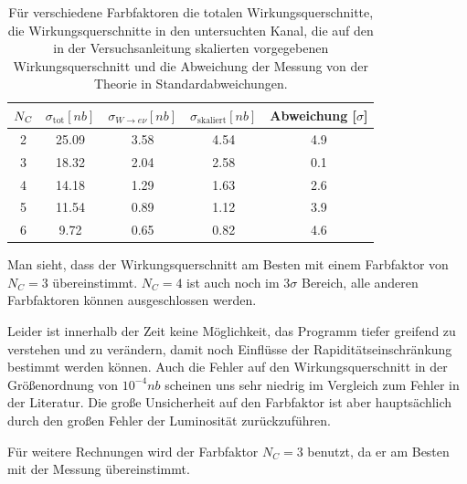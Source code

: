 \documentclass[a4paper,12pt]{article}
\begin{document}
\begin{table}[h]
	\centering
	\begin{tabular}{c| c c c|c}
		$N_{\textsl{C}}$ & $\sigma_\text{tot} [\si{nb}]$ &$σ_{W\rightarrow eν}[\si{nb}]$ &
		$σ_\text{skaliert}[\si{nb}]$
		& Abweichung [$σ$] \\
		\hline
2 & 25.09 & 3.58 & 4.54 & 4.9 \\
\hline
3 & 18.32 & 2.04 & 2.58 & 0.1 \\
4 & 14.18 & 1.29 & 1.63 & 2.6 \\
\hline
5 & 11.54 & 0.89 & 1.12 & 3.9 \\
6 & 9.72 & 0.65 & 0.82 & 4.6 \\
	\end{tabular}
	\caption{Für verschiedene Farbfaktoren die totalen Wirkungsquerschnitte, die
		Wirkungsquerschnitte in den untersuchten Kanal, die auf den in der Versuchsanleitung
		skalierten vorgegebenen Wirkungsquerschnitt und die Abweichung der
	Messung von der Theorie in Standardabweichungen.}
	\label{tab:color}
\end{table}

Man sieht, dass der Wirkungsquerschnitt am Besten mit einem Farbfaktor von $N_C = 3$ übereinstimmt.
$N_C = 4$ ist auch noch im $3σ$ Bereich, alle anderen Farbfaktoren können ausgeschlossen werden.

Leider ist innerhalb der Zeit keine Möglichkeit, das Programm tiefer greifend zu verstehen und zu
verändern, damit noch Einflüsse der Rapiditätseinschränkung bestimmt werden können. Auch die Fehler
auf den Wirkungsquerschnitt in der Größenordnung von $10^{-4}\si{nb}$ scheinen uns sehr niedrig im
Vergleich zum Fehler in der Literatur.
Die große Unsicherheit auf den Farbfaktor ist aber hauptsächlich durch den großen Fehler der
Luminosität zurückzuführen.

Für weitere Rechnungen wird der Farbfaktor $N_C = 3$ benutzt, da er am Besten mit der Messung
übereinstimmt.
\end{document}
